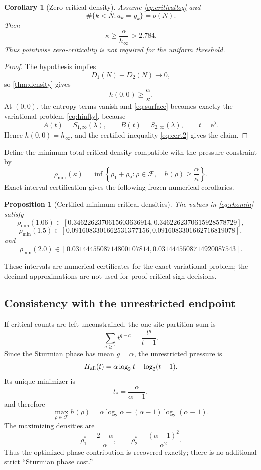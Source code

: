 \documentclass[11pt]{amsart}
\newtheorem{proposition}[theorem]{Proposition}
\newtheorem{corollary}[theorem]{Corollary}
\newcommand{\Fcal}{\mathcal F}
\newcommand{\e}{\mathrm e}
\begin{document}
\begin{corollary}[Zero critical density]\label{cor:zerodensity}
Assume \eqref{eq:criticallog} and
\[
 \#\{k<N:a_k=g_k\}=o(N).
\]
Then
\[
 \kappa\ge\frac{\alpha}{h_\infty}>2.784.
\]
Thus pointwise zero-criticality is not required for the uniform threshold.
\end{corollary}

\begin{proof}
The hypothesis implies
\[
 D_1(N)+D_2(N)\longrightarrow0,
\]
so \cref{thm:density} gives
\[
 h(0,0)\ge\frac{\alpha}{\kappa}.
\]
At \((0,0)\), the entropy terms vanish and \eqref{eq:surface} becomes exactly the variational problem \eqref{eq:hinfty}, because
\[
 A(t)=S_{1,\infty}(\lambda),
 \qquad
 B(t)=S_{2,\infty}(\lambda),
 \qquad t=\e^\lambda.
\]
Hence \(h(0,0)=h_\infty\), and the certified inequality \eqref{eq:cert2} gives the claim.
\end{proof}

Define the minimum total critical density compatible with the pressure constraint by
\begin{equation}\label{eq:rhomin}
 \rho_{\min}(\kappa)
 =\inf\left\{
 \rho_1+\rho_2:
 \rho\in\Fcal,\quad
 h(\rho)\ge\frac{\alpha}{\kappa}
 \right\}.
\end{equation}
Exact interval certification gives the following frozen numerical corollaries.

\begin{proposition}[Certified minimum critical densities]\label{prop:rhomin}
The values in \eqref{eq:rhomin} satisfy
\[
 \rho_{\min}(1.06)
 \in
 [0.3462262370615603636914,
  0.3462262370615928578729],
\]
\[
 \rho_{\min}(1.5)
 \in
 [0.0916083301662531377156,
  0.0916083301662716819078],
\]
and
\[
 \rho_{\min}(2.0)
 \in
 [0.0314445508714800107814,
  0.0314445508714920087543].
\]
\end{proposition}

These intervals are numerical certificates for the exact variational problem; the decimal approximations are not used for proof-critical sign decisions.

\subsection{Consistency with the unrestricted endpoint}

If critical counts are left unconstrained, the one-site partition sum is
\[
 \sum_{a\ge1}t^{g-a}
 =\frac{t^g}{t-1}.
\]
Since the Sturmian phase has mean \(g=\alpha\), the unrestricted pressure is
\[
 H_{\rm all}(t)
 =\alpha\log_2t-\log_2(t-1).
\]
Its unique minimizer is
\[
 t_*=\frac{\alpha}{\alpha-1},
\]
and therefore
\begin{equation}\label{eq:cp19}
 \max_{\rho\in\Fcal}h(\rho)
 =\alpha\log_2\alpha
 -(\alpha-1)\log_2(\alpha-1).
\end{equation}
The maximizing densities are
\[
 \rho_1^*=\frac{2-\alpha}{\alpha},
 \qquad
 \rho_2^*=\frac{(\alpha-1)^2}{\alpha^2}.
\]
Thus the optimized phase contribution is recovered exactly; there is no additional strict ``Sturmian phase cost.''
\end{document}
